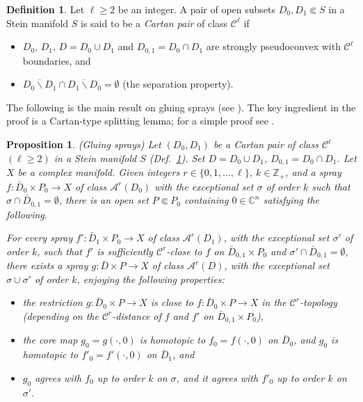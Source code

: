 \documentclass[11pt]{amsart}
\numberwithin{equation}{section}
\newtheorem{proposition}[theorem]{Proposition}
\theoremstyle{definition}
\newtheorem{definition}[theorem]{Definition}
\begin{document}
\begin{definition}
\label{Cartan-pair}
Let $\ell\ge 2$ be an integer.
A pair of open subsets $D_0,D_1 \Subset S$ in a Stein manifold $S$
is said to be a {\em Cartan pair} of class ${\mathcal{C}}^\ell$ if 
\begin{itemize}
\item[(i)]  $D_0$, $D_1$, $D=D_0\cup D_1$ and $D_{0,1}=D_0\cap D_1$ 
are strongly pseudoconvex with ${\mathcal{C}}^\ell$ boundaries, and 
\item[(ii)] $\overline {D_0\backslash D_1} \cap \overline {D_1\backslash D_0}=\emptyset$ 
(the separation property). 
\end{itemize}
\end{definition}

The following is the main result on gluing sprays (see \cite[Proposition 4.3]{BDF1}).
The key ingredient in the proof is a Cartan-type splitting lemma; for a simple
proof see \cite[Lemma 3.2]{FFAsian}.

\begin{proposition}
\label{gluing-sprays}
{\em (Gluing sprays)} 
Let $(D_0,D_1)$ be a Cartan pair of class ${\mathcal{C}}^\ell$ $(\ell\ge 2)$ in 
a Stein manifold $S$ (Def.\ \ref{Cartan-pair}). 
Set $D=D_0\cup D_1$, $D_{0,1}=D_0\cap D_1$. Let
$X$ be a complex manifold.
Given integers $r\in\{0,1,\ldots, \ell\}$, $k\in{\mathbb{Z}}_+$, 
and a spray $f\colon \bar D_0\times P_0\to X$ of class ${\mathcal{A}}^r(D_0)$ 
with the exceptional set $\sigma$ of order $k$ such that 
$\sigma \cap \bar D_{0,1}=\emptyset$, there is an open 
set $P {\Subset} P_0$ containing $0\in{\mathbb{C}}^n$ satisfying the following. 

For every spray $f' \colon \bar D_1 \times P_0 \to X$
of class ${\mathcal{A}}^r(D_1)$, with the exceptional set $\sigma'$ of order $k$,
such that $f'$ is sufficiently ${\mathcal{C}}^r$-close to $f$ on 
$\bar D_{0,1} \times P_0$ and $\sigma'\cap \bar D_{0,1}=\emptyset$, 
there exists a spray $g\colon \bar D \times P \to X$ 
of class ${\mathcal{A}}^r(D)$, with the exceptional set $\sigma\cup \sigma'$ 
of order $k$, enjoying the following properties:
\begin{itemize}
\item[(i)] the restriction $g\colon \bar D_0\times P \to X$ 
is close to $f \colon \bar D_0\times P \to X$ in the ${\mathcal{C}}^r$-topology
(depending on the ${\mathcal{C}}^r$-distance of $f$ and $f'$ on $\bar D_{0,1} \times P_0$),
\item[(ii)] the core map $g_0=g(\cdotp,0)$ is homotopic to 
$f_0=f(\cdotp,0)$ on $\bar D_0$, 
and $g_0$ is homotopic to $f'_0=f'(\cdotp,0)$ on $\bar D_1$, and
\item[(iii)] $g_0$ agrees with $f_0$ up to order $k$ on $\sigma$, 
and it agrees with $f'_0$ up to order $k$ on $\sigma'$.
\end{itemize}
\end{proposition}
\end{document}
